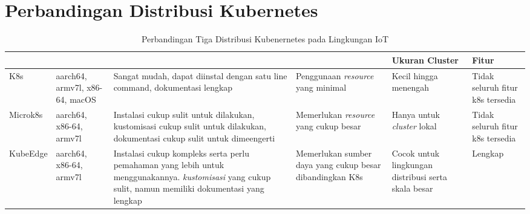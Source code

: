 \chapter{Perbandingan Distribusi Kubernetes}

\bgroup
\begin{table}[ht]
  \def\arraystretch{1.5}
  \caption{Perbandingan Tiga Distribusi Kubenernetes pada Lingkungan IoT}
  \label{tab:perbandingan-distribusi-kubernetes}
  \centering
  \begin{tabular}{|p{1.7cm}|p{1.7cm}|p{2.3cm}|p{2cm}|p{1.5cm}|p{2cm}|}
    \hline
    \centering{Nama} & \centering{Dukungan arsitektur} & \centering{Instalasi dan Penggunaan}                                                                                                                           & \centering{Komputasi \textit{resource}}                  & Ukuran Cluster                                      & Fitur                            \\
    \hline
    K8s              & aarch64, armv7l, x86-64, macOS  & Sangat mudah, dapat diinstal dengan satu line command, dokumentasi lengkap                                                                                     & Penggunaan \textit{resource} yang minimal                & Kecil hingga menengah                               & Tidak seluruh fitur k8s tersedia \\
    \hline
    Microk8s         & aarch64, x86-64, armv7l         & Instalasi cukup sulit untuk dilakukan, kustomisasi cukup sulit untuk dilakukan, dokumentasi cukup sulit untuk dimeengerti                                      & Memerlukan \textit{resource} yang cukup besar            & Hanya untuk \textit{cluster} lokal                  & Tidak seluruh fitur k8s tersedia \\
    \hline
    KubeEdge         & aarch64, x86-64, armv7l         & Instalasi cukup kompleks serta perlu pemahaman yang lebih untuk menggunakannya. \textit{kustomisasi} yang cukup sulit, namun memiliki dokumentasi yang lengkap & Memerlukan sumber daya yang cukup besar dibandingkan K8s & Cocok untuk lingkungan distribusi serta skala besar & Lengkap                          \\
    \hline
  \end{tabular}
\end{table}
\egroup
